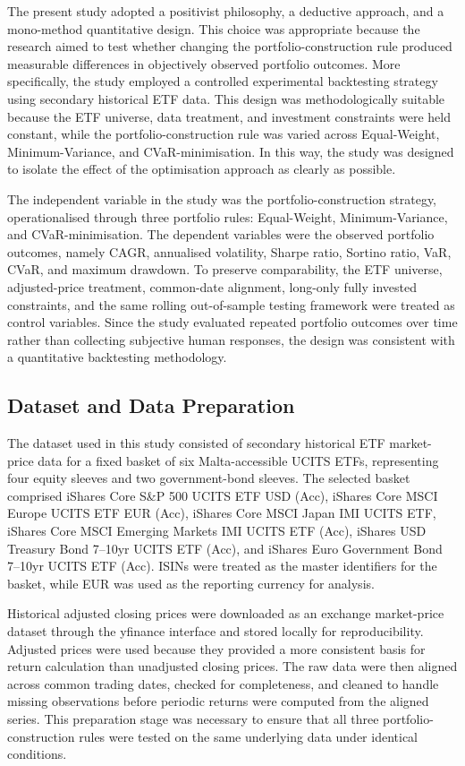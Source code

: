 \par The present study adopted a positivist philosophy, a deductive approach, and a mono-method quantitative design. This choice was appropriate because the research aimed to test whether changing the portfolio-construction rule produced measurable differences in objectively observed portfolio outcomes. More specifically, the study employed a controlled experimental backtesting strategy using secondary historical ETF data. This design was methodologically suitable because the ETF universe, data treatment, and investment constraints were held constant, while the portfolio-construction rule was varied across Equal-Weight, Minimum-Variance, and CVaR-minimisation. In this way, the study was designed to isolate the effect of the optimisation approach as clearly as possible.
\par The independent variable in the study was the portfolio-construction strategy, operationalised through three portfolio rules: Equal-Weight, Minimum-Variance, and CVaR-minimisation. The dependent variables were the observed portfolio outcomes, namely CAGR, annualised volatility, Sharpe ratio, Sortino ratio, VaR, CVaR, and maximum drawdown. To preserve comparability, the ETF universe, adjusted-price treatment, common-date alignment, long-only fully invested constraints, and the same rolling out-of-sample testing framework were treated as control variables. Since the study evaluated repeated portfolio outcomes over time rather than collecting subjective human responses, the design was consistent with a quantitative backtesting methodology.

\subsection{Dataset and Data Preparation}
\par The dataset used in this study consisted of secondary historical ETF market-price data for a fixed basket of six Malta-accessible UCITS ETFs, representing four equity sleeves and two government-bond sleeves. The selected basket comprised iShares Core S\&P 500 UCITS ETF USD (Acc), iShares Core MSCI Europe UCITS ETF EUR (Acc), iShares Core MSCI Japan IMI UCITS ETF, iShares Core MSCI Emerging Markets IMI UCITS ETF (Acc), iShares USD Treasury Bond 7–10yr UCITS ETF (Acc), and iShares Euro Government Bond 7–10yr UCITS ETF (Acc). ISINs were treated as the master identifiers for the basket, while EUR was used as the reporting currency for analysis.
\par Historical adjusted closing prices were downloaded as an exchange market-price dataset through the yfinance interface and stored locally for reproducibility. Adjusted prices were used because they provided a more consistent basis for return calculation than unadjusted closing prices. The raw data were then aligned across common trading dates, checked for completeness, and cleaned to handle missing observations before periodic returns were computed from the aligned series. This preparation stage was necessary to ensure that all three portfolio-construction rules were tested on the same underlying data under identical conditions.

